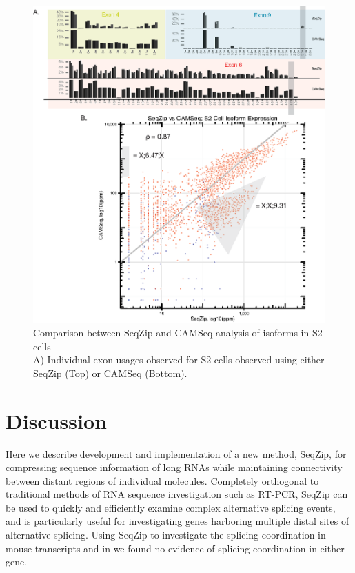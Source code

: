 		\begin{figure} %
			  \centering 
			  \includegraphics{Figures/SeqZipPaper/Roy2014FigS5.eps}
			  \caption[Comparison between SeqZip and CAMSeq analysis of \dscam{} isoforms in S2 cells]
			  {Comparison between SeqZip and CAMSeq analysis of \dscam{} isoforms in S2 cells \\[0.25cm]
			    A) Individual exon usages observed for S2 cells observed using either SeqZip (Top) or CAMSeq (Bottom). 
			    }
			  \label{SeqZipPaper:fig:Roy2014 FS5}
			  \end{figure}

\section{Discussion}
	\label{SeqZipPaper:sec:Discussion}

	Here we describe development and implementation of a new method, SeqZip, for compressing sequence information of long RNAs while maintaining connectivity between distant regions of individual molecules. Completely orthogonal to traditional methods of RNA sequence investigation such as RT-PCR, SeqZip can be used to quickly and efficiently examine complex alternative splicing events, and is particularly useful for investigating genes harboring multiple distal sites of alternative splicing. Using SeqZip to investigate the splicing coordination in mouse \fn{} transcripts and in \flies{} \dscam{} we found no evidence of splicing coordination in either gene. 


